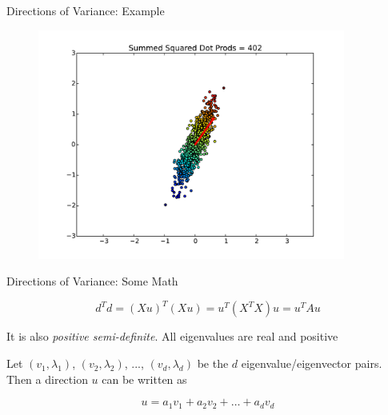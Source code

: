 \documentclass{beamer}
\begin{document}
\begin{frame}{Directions of Variance: Example}

\begin{figure}[t]
    \centering
	\includegraphics[width=0.9\textwidth]{2DPCADir4.pdf}
\end{figure}

\end{frame}

\begin{frame}{Directions of Variance: Some Math}

\[ d^Td = (Xu)^T(Xu) = u^T (X^TX) u = u^T A u \]

\begin{itemize}[label=$\vartriangleright$]
 {
\item It is also {\em positive semi-definite}.  All eigenvalues are real and positive
}
 {
\item
Let $(v_1, \lambda_1)$, $(v_2, \lambda_2)$, ..., $(v_d, \lambda_d)$ be the $d$ eigenvalue/eigenvector pairs.  Then a direction $u$ can be written as

\[ u = a_1 v_1 + a_2 v_2 + \hdots + a_d v_d \]

}

\end{itemize}

\end{frame}
\end{document}
